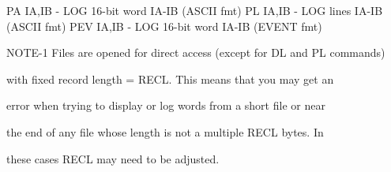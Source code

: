    PA  IA,IB      - LOG     16-bit word IA-IB (ASCII fmt)
   PL  IA,IB      - LOG     lines       IA-IB (ASCII fmt)
   PEV IA,IB      - LOG     16-bit word IA-IB (EVENT fmt)
 
 
 
   NOTE-1  Files  are opened for direct access (except for DL and PL commands)
 
          with fixed record length = RECL. This means  that  you  may  get  an
 
          error  when trying to display or log words from a short file or near
 
          the end of any file whose length is not a multiple  RECL  bytes.  In
 
          these cases RECL may need to be adjusted.
 
